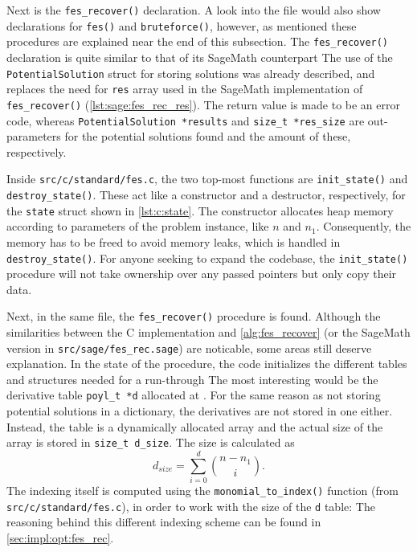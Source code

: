 Next is the \texttt{fes\_recover()} declaration. A look into the file would also show declarations for \texttt{fes()} and \texttt{bruteforce()}, however, as mentioned these procedures are explained near the end of this subsection. The \texttt{fes\_recover()} declaration is quite similar to that of its SageMath counterpart
The use of the \texttt{PotentialSolution} struct for storing solutions was already described, and replaces the need for \texttt{res} array used in the SageMath implementation of \texttt{fes\_recover()} (\cref{lst:sage:fes_rec_res}). The return value is made to be an error code, whereas \texttt{PotentialSolution *results} and \texttt{size\_t *res\_size} are out-parameters for the potential solutions found and the amount of these, respectively.

Inside \texttt{src/c/standard/fes.c}, the two top-most functions are \texttt{init\_state()} and \texttt{destroy\_state()}. These act like a constructor and a destructor, respectively, for the \texttt{state} struct shown in \cref{lst:c:state}. The constructor allocates heap memory according to parameters of the problem instance, like $n$ and $n_1$. Consequently, the memory has to be freed to avoid memory leaks, which is handled in \texttt{destroy\_state()}. For anyone seeking to expand the codebase, the \texttt{init\_state()} procedure will not take ownership over any passed pointers but only copy their data.

Next, in the same file, the \texttt{fes\_recover()} procedure is found. Although the similarities between the C implementation and \cref{alg:fes_recover} (or the SageMath version in \texttt{src/sage/fes\_rec.sage}) are noticable, some areas still deserve explanation. In the state of the procedure, the code initializes the different tables and structures needed for a run-through
The most interesting would be the derivative table \texttt{poyl\_t *d} allocated at . For the same reason as not storing potential solutions in a dictionary, the derivatives are not stored in one either. Instead, the table is a dynamically allocated array and the actual size of the array is stored in \texttt{size\_t d\_size}. The size is calculated as 
\begin{equation}
    d_{size} = \sum_{i = 0}^{d} \binom{n - n_1}{i}.
\end{equation}
The indexing itself is computed using the \texttt{monomial\_to\_index()} function (from \texttt{src/c/standard/fes.c}), in order to work with the size of the \texttt{d} table:
The reasoning behind this different indexing scheme can be found in \cref{sec:impl:opt:fes_rec}.

